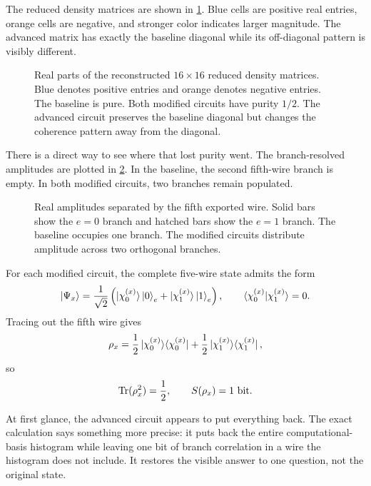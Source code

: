 The reduced density matrices are shown in
\cref{fig:caseii-density-matrices}. Blue cells are positive real entries,
orange cells are negative, and stronger color indicates larger magnitude. The
advanced matrix has exactly the baseline diagonal while its off-diagonal
pattern is visibly different.

\begin{figure}[tbp]
\centering

\caption{Real parts of the reconstructed $16\times16$ reduced density
matrices. Blue denotes positive entries and orange denotes negative entries.
The baseline is pure. Both modified circuits have purity $1/2$. The advanced
circuit preserves the baseline diagonal but changes the coherence pattern away
from the diagonal.}
\label{fig:caseii-density-matrices}
\end{figure}

There is a direct way to see where that lost purity went. The branch-resolved
amplitudes are plotted in \cref{fig:caseii-branch-amplitudes}. In the baseline,
the second fifth-wire branch is empty. In both modified circuits, two branches
remain populated.

\begin{figure}[tbp]
\centering

\caption{Real amplitudes separated by the fifth exported wire. Solid bars show
the $e=0$ branch and hatched bars show the $e=1$ branch. The baseline occupies
one branch. The modified circuits distribute amplitude across two orthogonal
branches.}
\label{fig:caseii-branch-amplitudes}
\end{figure}

For each modified circuit, the complete five-wire state admits the form
\begin{equation}
  \ket{\Psi_x}
  =\frac{1}{\sqrt2}
   \left(
     \ket{\chi^{(x)}_0}\ket{0}_e
     +\ket{\chi^{(x)}_1}\ket{1}_e
   \right),
  \qquad
  \braket{\chi^{(x)}_0|\chi^{(x)}_1}=0.
  \label{eq:caseii-schmidt}
\end{equation}
Tracing out the fifth wire gives
\begin{equation}
  \rho_x
  =\frac12\ket{\chi^{(x)}_0}\!\bra{\chi^{(x)}_0}
  +\frac12\ket{\chi^{(x)}_1}\!\bra{\chi^{(x)}_1},
\end{equation}
so
\begin{equation}
  \operatorname{Tr}(\rho_x^2)=\frac12,
  \qquad
  S(\rho_x)=1\ \text{bit}.
  \label{eq:caseii-one-bit}
\end{equation}

At first glance, the advanced circuit appears to put everything back. The exact
calculation says something more precise: it puts back the entire
computational-basis histogram while leaving one bit of branch correlation in a
wire the histogram does not include. It restores the visible answer to one
question, not the original state.

